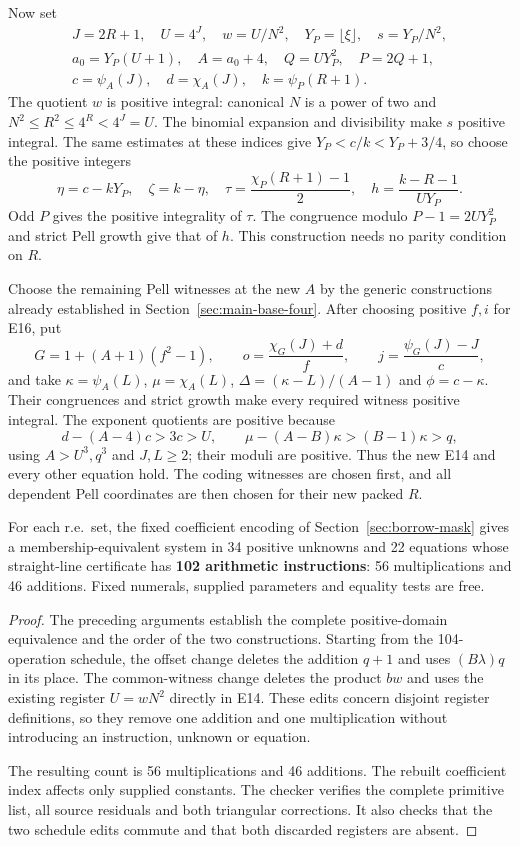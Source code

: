 Now set
\[
\begin{gathered}
 J=2R+1,\quad U=4^J,\quad w=U/N^2,\quad
 Y_P=\lfloor\xi\rfloor,\quad s=Y_P/N^2,\\
 a_0=Y_P(U+1),\quad A=a_0+4,\quad Q=UY_P^2,
 \quad P=2Q+1,\\
 c=\psi_A(J),\quad d=\chi_A(J),\quad k=\psi_P(R+1).
\end{gathered}
\]
The quotient $w$ is positive integral: canonical $N$ is a power of
two and $N^2\le R^2\le4^R<4^J=U$. The binomial expansion and
divisibility make $s$ positive integral. The same estimates at these
indices give $Y_P<c/k<Y_P+3/4$, so choose the positive integers
\[
 \eta=c-kY_P,\quad \zeta=k-\eta,\quad
 \tau=\frac{\chi_P(R+1)-1}{2},\quad
 h=\frac{k-R-1}{UY_P}.
\]
Odd $P$ gives the positive integrality of $\tau$. The congruence
modulo $P-1=2UY_P^2$ and strict Pell growth give that of $h$.
This construction needs no parity condition on $R$.

Choose the remaining Pell witnesses at the new $A$ by the generic
constructions already established in Section~\ref{sec:main-base-four}.
After choosing positive $f,i$ for E16, put
\[
 G=1+(A+1)(f^2-1),\qquad
 o=\frac{\chi_G(J)+d}{f},\qquad
 j=\frac{\psi_G(J)-J}{c},
\]
and take $\kappa=\psi_A(L)$, $\mu=\chi_A(L)$,
$\Delta=(\kappa-L)/(A-1)$ and $\phi=c-\kappa$.
Their congruences and strict growth make every required witness
positive integral. The exponent quotients are positive because
\[
 d-(A-4)c>3c>U,\qquad
 \mu-(A-B)\kappa>(B-1)\kappa>q,
\]
using $A>U^3,q^3$ and $J,L\ge2$; their moduli are positive.
Thus the new E14 and every other equation hold. The coding witnesses
are chosen first, and all dependent Pell coordinates are then chosen
for their new packed $R$.

\begin{theorem}\label{thm:best102}
For each r.e.\ set, the fixed coefficient encoding of
Section~\ref{sec:borrow-mask} gives a membership-equivalent system
in 34 positive unknowns and 22 equations whose straight-line
certificate has \textbf{102 arithmetic instructions}:
56 multiplications and 46 additions. Fixed numerals, supplied
parameters and equality tests are free.
\end{theorem}
\begin{proof}
The preceding arguments establish the complete positive-domain
equivalence and the order of the two constructions.
Starting from the 104-operation schedule, the offset change deletes
the addition $q+1$ and uses $(B\lambda)q$ in its place.
The common-witness change deletes the product $bw$ and uses the
existing register $U=wN^2$ directly in E14. These edits concern
disjoint register definitions, so they remove one addition and one
multiplication without introducing an instruction, unknown or equation.

The resulting count is 56 multiplications and 46 additions.
The rebuilt coefficient index affects only supplied constants.
The checker 
verifies the complete primitive list, all source residuals and both
triangular corrections. It also checks that the two schedule edits
commute and that both discarded registers are absent.
\end{proof}
